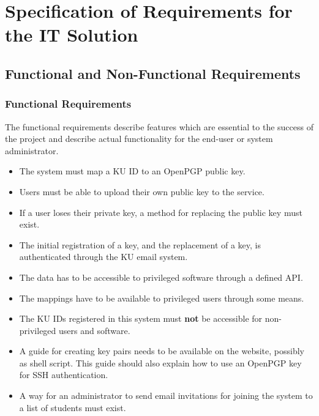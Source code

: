 \documentclass[11pt,a4paper]{report}
\begin{document}
\renewcommand{\thesubsection}{\thesection.\alph{subsection}}
\section{Specification of Requirements for the IT Solution}\label{sec:Requirements}
\subsection{Functional and Non-Functional Requirements}
\subsubsection{Functional Requirements}\label{subsubsec:Functional_Req}
The functional requirements describe features which are essential to the success of the project and describe actual functionality for the end-user or system administrator.
\begin{itemize}
\item The system must map a KU ID to an OpenPGP public key.
\item Users must be able to upload their own public key to the service.
\item If a user loses their private key, a method for replacing the public key must exist.
\item The initial registration of a key, and the replacement of a key, is authenticated through the KU email system.
\item The data has to be accessible to privileged software through a defined API.
\item The mappings have to be available to privileged users through some means.
\item The KU IDs registered in this system must \textbf{not} be accessible for non-privileged users and software.
\item A guide for creating key pairs needs to be available on the website, possibly as shell script. This guide should also explain how to use an OpenPGP key for SSH authentication.
\item A way for an administrator to send email invitations for joining the system to a list of students must exist.
\end{itemize}
\end{document}
